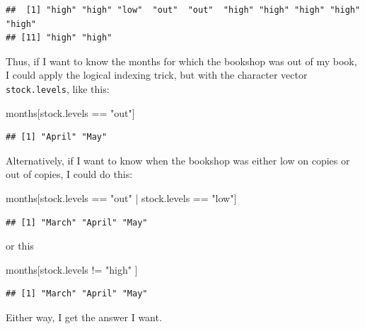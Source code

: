 \documentclass[
]{book}
\newenvironment{Shaded}{\begin{snugshade}}{\end{snugshade}}
\newcommand{\NormalTok}[1]{#1}
\newcommand{\SpecialCharTok}[1]{\textcolor[rgb]{0.00,0.00,0.00}{#1}}
\newcommand{\StringTok}[1]{\textcolor[rgb]{0.31,0.60,0.02}{#1}}
\begin{document}
\begin{verbatim}
##  [1] "high" "high" "low"  "out"  "out"  "high" "high" "high" "high" "high"
## [11] "high" "high"
\end{verbatim}

Thus, if I want to know the months for which the bookshop was out of my book, I could apply the logical indexing trick, but with the character vector \texttt{stock.levels}, like this:

\begin{Shaded}
\begin{Highlighting}[]
\NormalTok{months[stock.levels }\SpecialCharTok{==} \StringTok{"out"}\NormalTok{]}
\end{Highlighting}
\end{Shaded}

\begin{verbatim}
## [1] "April" "May"
\end{verbatim}

Alternatively, if I want to know when the bookshop was either low on copies or out of copies, I could do this:

\begin{Shaded}
\begin{Highlighting}[]
\NormalTok{months[stock.levels }\SpecialCharTok{==} \StringTok{"out"} \SpecialCharTok{|}\NormalTok{ stock.levels }\SpecialCharTok{==} \StringTok{"low"}\NormalTok{]}
\end{Highlighting}
\end{Shaded}

\begin{verbatim}
## [1] "March" "April" "May"
\end{verbatim}

or this

\begin{Shaded}
\begin{Highlighting}[]
\NormalTok{months[stock.levels }\SpecialCharTok{!=} \StringTok{"high"}\NormalTok{ ]}
\end{Highlighting}
\end{Shaded}

\begin{verbatim}
## [1] "March" "April" "May"
\end{verbatim}

Either way, I get the answer I want.
\end{document}

